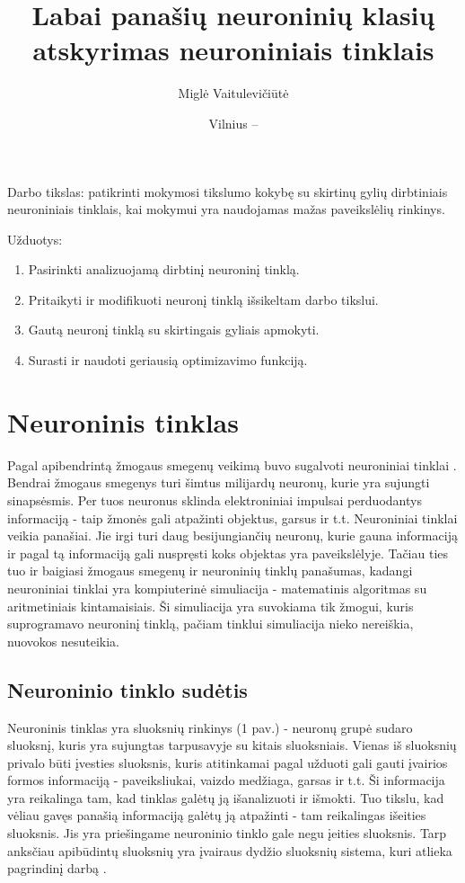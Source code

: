 \documentclass{VUMIFPSkursinis}
\title{Labai panašių neuroninių klasių atskyrimas neuroniniais tinklais}
\author{Miglė Vaitulevičiūtė}
\date{Vilnius – \the\year}
\begin{document}
	
\maketitle
\cleardoublepage{}
\setcounter{page}{2}

\tableofcontents


Darbo tikslas: patikrinti mokymosi tikslumo kokybę su skirtinų gylių dirbtiniais neuroniniais tinklais, kai mokymui yra naudojamas mažas paveikslėlių rinkinys.

Užduotys:
\begin{enumerate}
\item Pasirinkti analizuojamą dirbtinį neuroninį tinklą.
\item Pritaikyti ir modifikuoti neuronį tinklą išsikeltam darbo tikslui.
\item Gautą neuronį tinklą su skirtingais gyliais apmokyti.
\item Surasti ir naudoti geriausią optimizavimo funkciją.
\end{enumerate}


\section{Neuroninis tinklas}
Pagal apibendrintą žmogaus smegenų veikimą buvo sugalvoti neuroniniai tinklai \cite{Goodfellow-et-al-2016}. Bendrai žmogaus smegenys turi šimtus
milijardų neuronų, kurie yra sujungti sinapsėsmis. Per tuos neuronus sklinda elektroniniai impulsai perduodantys informaciją - taip žmonės gali 
atpažinti objektus, garsus ir t.t. Neuroniniai tinklai veikia panašiai. Jie irgi turi daug besijungiančių neuronų, kurie gauna informaciją ir 
pagal tą informaciją gali nuspręsti koks objektas yra paveikslėlyje. Tačiau ties tuo ir baigiasi žmogaus smegenų ir neuroninių tinklų panašumas, 
kadangi neuroniniai tinklai yra kompiuterinė simuliacija - matematinis algoritmas su aritmetiniais kintamaisiais. Ši simuliacija yra suvokiama 
tik žmogui, kuris suprogramavo neuroninį tinklą, pačiam tinklui simuliacija nieko nereiškia, nuovokos nesuteikia.

\subsection{Neuroninio tinklo sudėtis}
Neuroninis tinklas yra sluoksnių rinkinys (1 pav.) - neuronų grupė sudaro sluoksnį, kuris yra sujungtas tarpusavyje su kitais sluoksniais. Vienas iš
sluoksnių privalo būti įvesties sluoksnis, kuris atitinkamai pagal užduoti gali gauti įvairios formos informaciją - paveiksliukai, vaizdo
medžiaga, garsas ir t.t. Ši informacija yra reikalinga tam, kad tinklas galėtų ją išanalizuoti ir išmokti. Tuo tikslu, kad vėliau gavęs panašią
informaciją galėtų ją atpažinti - tam reikalingas išeities sluoksnis. Jis yra priešingame neuroninio tinklo gale negu įeities sluoksnis.
Tarp anksčiau apibūdintų sluoksnių yra įvairaus dydžio sluoksnių sistema, kuri atlieka pagrindinį darbą \cite{Woodford-2018}.
\end{document}
